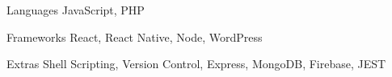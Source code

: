 
\begin{cvskills}
  \cvskill
    {Languages} %
    {JavaScript, PHP} %

  \cvskill
    {Frameworks} %
    {React, React Native, Node, WordPress} %
    
   \cvskill
    {Extras} %
    {Shell Scripting, Version Control, Express, MongoDB, Firebase, JEST} %
\end{cvskills}
